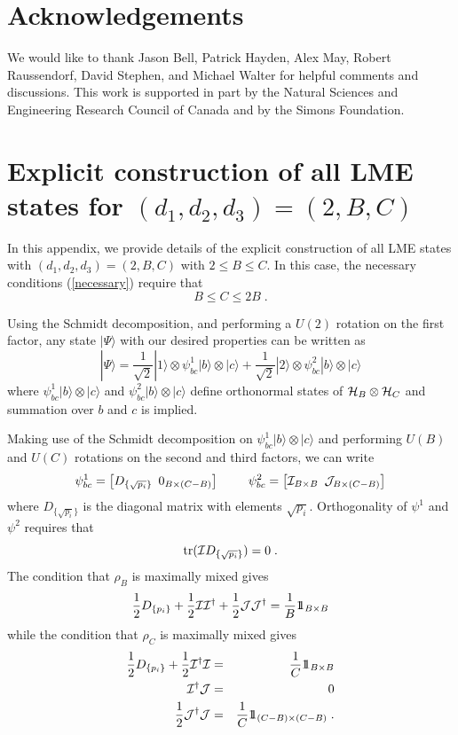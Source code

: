 \documentclass[12pt]{article}
\theoremstyle{definition}
\newcommand{\be}{\begin{equation}}
\newcommand{\ee}{\end{equation}}
\newcommand{\bea}{\begin{eqnarray}}
\newcommand{\eea}{\end{eqnarray}}
\def\identity{{\rlap{1} \hskip 1.6pt \hbox{1}}}
\newcommand{\tr}{{\rm tr}}
\begin{document}
\section*{Acknowledgements}

We would like to thank Jason Bell, Patrick Hayden, Alex May, Robert Raussendorf, David Stephen, and Michael Walter for helpful comments and discussions. This work is supported in part by the Natural Sciences and Engineering Research Council of Canada and by the Simons Foundation.

\appendix

\section{Explicit construction of all LME states for $(d_1,d_2,d_3) = (2,B,C)$}

In this appendix, we provide details of the explicit construction of all LME states with $(d_1, d_2, d_3) = (2,B,C)$ with $2 \le B \le C$. In this case, the necessary conditions (\ref{necessary}) require that
\be
B \le C \le 2 B \; .
\ee

Using the Schmidt decomposition, and performing a $U(2)$ rotation on the first factor, any state $|\Psi \rangle$ with our desired properties can be written as
\be
|\Psi \rangle = \frac{1}{\sqrt{2}} | 1 \rangle  \otimes \psi^1_{bc} |b\rangle  \otimes |c \rangle + \frac{1}{\sqrt{2}} | 2 \rangle  \otimes \psi^2_{bc} |b\rangle  \otimes |c \rangle
\ee
where $\psi^1_{bc} |b\rangle  \otimes |c \rangle$ and $\psi^2_{bc} |b\rangle  \otimes |c \rangle$ define orthonormal states of ${\cal H}_B  \otimes {\cal H}_C$ and summation over $b$ and $c$ is implied.

Making use of the Schmidt decomposition on $\psi^1_{bc} |b\rangle  \otimes |c \rangle$ and performing $U(B)$ and $U(C)$ rotations on the second and third factors, we can write
\be
\psi^1_{bc} = {\large \left[D_{\{\sqrt{p_i}\}} \, \, \,  0_{B \times (C-B)} \right] \qquad
\psi^2_{bc} = \left[{\cal I}_{B \times B} \, \, \, {\cal J}_{B \times (C-B)} \right]}
\ee
where $D_{\{\sqrt{p_i}\}}$ is the diagonal matrix with elements $\sqrt{p_i}$. Orthogonality of $\psi^1$ and $\psi^2$ requires that
\be
\label{cond1}
\tr({\cal I}D_{\{ \sqrt{p_i} \}}) = 0 \; .
\ee
The condition that $\rho_B$ is maximally mixed gives
\be
\label{cond2}
\frac{1}{2} D_{\{p_i\}} + \frac{1}{2} {\cal I} {\cal I}^\dagger + \frac{1}{2} {\cal J} {\cal J}^\dagger = \frac{1}{B} \identity_{B \times B}
\ee
while the condition that $\rho_C$ is maximally mixed gives
\bea
\label{cond3}
\frac{1}{2} D_{\{p_i\}} + \frac{1}{2} {\cal I}^\dagger {\cal I}  &=& \frac{1}{C} \identity_{B \times B} \\
\label{cond4}
{\cal I}^\dagger {\cal J} &=& 0 \\
\frac{1}{2} {\cal J}^\dagger {\cal J} &=& \frac{1}{C} \identity_{(C-B) \times (C-B)} \; .
\label{cond5}
\eea
\end{document}

